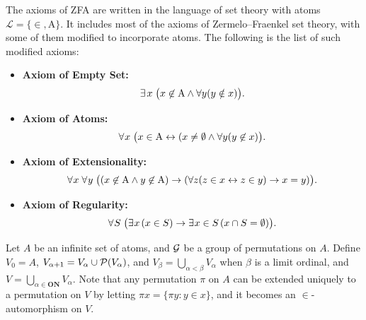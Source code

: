 The axioms of ZFA are written in the language of set theory with atoms $\mathcal{L}=\{\in,\text{A}\}$. It includes most of the axioms of Zermelo–Fraenkel set theory, with some of them modified to incorporate atoms. The following is the list of such modified axioms:

\begin{itemize}

     \item \textbf{Axiom of Empty Set:} 
    \[
    \exists\hspace{0.05cm} x \hspace{0.1cm}\big(x\not\in\text{A}\land\forall y (y \notin x)\big).
    \]

    \item \textbf{Axiom of Atoms:} 
    \[
    \forall\hspace{0.02cm} x \hspace{0.05cm}\hspace{0.05cm}\big(x\in\text{A}\leftrightarrow (x\neq \emptyset\land\forall y (y \not\in x)\big).
    \]
    
    \item \textbf{Axiom of Extensionality:} 
    \[
    \forall\hspace{0.02cm} x \hspace{0.05cm}\hspace{0.05cm}\forall \hspace{0.02cm}y\hspace{0.05cm}\hspace{0.05cm} \big((x\not\in\text{A}\land y\not\in\text{A})\to(\forall z (z \in x \leftrightarrow z \in y) \rightarrow x = y)\big).
    \]

    \item \textbf{Axiom of Regularity:}
    \[
    \forall\hspace{0.02cm} S \hspace{0.05cm}\hspace{0.05cm}\big(\exists\hspace{0.02cm} x\hspace{0.05cm}(x\in S)\rightarrow\exists \hspace{0.02cm}x\in S\hspace{0.05cm}(x\cap S=\emptyset)\big).
    \]
\end{itemize}

Let $A$ be an infinite set of atoms, and $\mathcal{G}$ be a group of permutations on $A$. Define $V_0 = A$, $V_{\alpha+1} = V_\alpha \cup \mathcal{P}(V_\alpha)$, and $V_\beta = \bigcup_{\alpha<\beta} V_\alpha$ when $\beta$ is a limit ordinal, and $V = \bigcup_{\alpha\in \textbf{ON}} V_\alpha$. Note that any permutation $\pi$ on $A$ can be extended uniquely to a permutation on $V$ by letting $\pi x = \{\pi y : y\in x\}$, and it becomes an $\in$-automorphism on $V$. 


